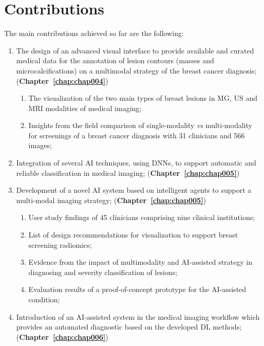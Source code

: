 \clearpage

\section{Contributions}
\label{sec:sec001004}

The main contributions achieved so far are the following:

\begin{enumerate}
\item The design of an advanced visual interface to provide available and curated medical data for the annotation of lesion contours (masses and microcalcifications) on a multimodal strategy of the breast cancer diagnosis; ({\bf Chapter~\ref{chap:chap004}})
\begin{enumerate}[label*=\arabic*.]
\item The visualization of the two main types of breast lesions in \ac{MG}, \ac{US} and \ac{MRI} modalities of medical imaging;
\item Insights from the field comparison of single-modality {\it vs} multi-modality for screenings of a breast cancer diagnosis with 31 clinicians and 566 images;
\end{enumerate}
\item Integration of several \ac{AI} techniques, using \acp{DNN}, to support automatic and reliable classification in medical imaging; ({\bf Chapter~\ref{chap:chap005}})
\item Development of a novel \ac{AI} system based on intelligent agents to support a multi-modal imaging strategy; ({\bf Chapter~\ref{chap:chap005}})
\begin{enumerate}[label*=\arabic*.]
\item User study findings of 45 clinicians comprising nine clinical institutions;
\item List of design recommendations for visualization to support breast screening radiomics;
\item Evidence from the impact of multimodality and \ac{AI}-assisted strategy in diagnosing and severity classification of lesions;
\item Evaluation results of a proof-of-concept prototype for the \ac{AI}-assisted condition;
\end{enumerate}
\item Introduction of an \ac{AI}-assisted system in the medical imaging workflow which provides an automated diagnostic based on the developed \ac{DL} methods; ({\bf Chapter~\ref{chap:chap006}})
\begin{enumerate}[label*=\arabic*.]

\end{enumerate}
\end{enumerate}
